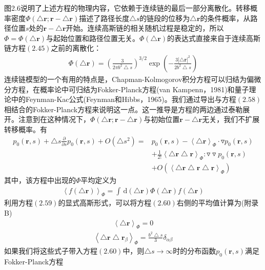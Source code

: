 图2.6说明了上述方程的物理内容，它依赖于连续链的最后一部分离散化。转移概率密度$\Phi(\bigtriangleup \mathbf{r};\mathbf{r}-\bigtriangleup \mathbf{r})$描述了路径长度$\bigtriangleup s$的链段的位移为$\bigtriangleup \mathbf{r}$的条件概率，从路径位置$s$处的$\mathbf{r}-\bigtriangleup \mathbf{r}$开始。连续高斯链的相关随机过程是稳定的，所以$\Phi =\Phi(\bigtriangleup \mathbf{r})$与起始位置和路径位置无关。$\Phi(\bigtriangleup \mathbf{r})$的表达式直接来自于连续高斯链方程$(2.45)$之前的离散化：
\begin{gather}
\Phi(\bigtriangleup \mathbf{r})=\left( \frac{3}{2\pi b^2 \bigtriangleup s} \right)^{3/2}\exp \left(- \frac{3\left| \bigtriangleup \mathbf{r} \right|^2}{2b^2 \bigtriangleup s} \right)
\end{gather}
连续链模型的一个有用的特点是，Chapman-Kolmogorov积分方程可以归结为偏微分方程，在概率论中可归结为Fokker-Planck方程(van Kampenn，1981)和量子理论中的Feynman-Kac公式(Feynman和Hibbs，1965)。我们通过导出与方程$(2.58)$相结合的Fokker-Planck方程来说明这一点。这一推导是方程的两边通过泰勒展开。注意到在这种情况下，$\Phi(\bigtriangleup \mathbf{r};\mathbf{r}-\bigtriangleup \mathbf{r})$与初始位置$\mathbf{r}-\bigtriangleup \mathbf{r}$无关，我们不扩展转移概率。有
\begin{equation}
\begin{aligned}
p_0(\mathbf{r},s)+\bigtriangleup s\frac{\partial}{\partial s}p_0(\mathbf{r},s)+O(\bigtriangleup s^2)=&p_0(\mathbf{r},s)-\left \langle \bigtriangleup \mathbf{r} \right \rangle _\Phi \cdot \triangledown p_0 (\mathbf{r},s)\\ &+\frac{1}{2!}\left \langle \bigtriangleup \mathbf{r}  \bigtriangleup \mathbf{r} \right \rangle _\Phi:\triangledown \triangledown p_0(\mathbf{r},s)\\ &+O(\left \langle \bigtriangleup \mathbf{r}  \bigtriangleup \mathbf{r}  \bigtriangleup \mathbf{r} \right \rangle _\Phi)
\end{aligned}
\end{equation}
其中，该方程中出现的$\Phi$平均定义为
\begin{gather}
\left \langle f(\bigtriangleup \mathbf{r}) \right \rangle _\Phi = \int \, \mathrm{d}(\bigtriangleup \mathbf{r})\Phi (\bigtriangleup \mathbf{r})f(\bigtriangleup \mathbf{r})
\end{gather}
利用方程$(2.59)$的显式高斯形式，可以将方程$(2.60)$右侧的平均值计算为(附录B)
\begin{gather}
\left \langle \bigtriangleup \mathbf{r} \right \rangle _\Phi = 0
\end{gather}
\begin{gather}
\left \langle \bigtriangleup \mathbf{r} \bigtriangleup \mathbf{r}_\beta \right \rangle _\Phi = \frac{b^2 \bigtriangleup s}{3}\delta_{\alpha \beta}
\end{gather}
如果我们将这些式子带入方程$(2.60)$中，则$\bigtriangleup s \rightarrow \infty$时的分布函数$p_0(\mathbf{r},s)$满足Fokker-Planck方程

